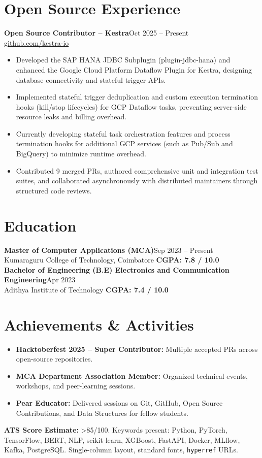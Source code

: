\documentclass[10pt]{article}
\begin{document}
\section{Open Source Experience}
\textbf{Open Source Contributor -- Kestra}\hfill Oct 2025 -- Present\\
\href{https://github.com/kestra-io}{github.com/kestra-io}
\begin{itemize}
  \item Developed the SAP HANA JDBC Subplugin (plugin-jdbc-hana) and enhanced the Google Cloud Platform Dataflow Plugin for Kestra, designing database connectivity and stateful trigger APIs.
  \item Implemented stateful trigger deduplication and custom execution termination hooks (kill/stop lifecycles) for GCP Dataflow tasks, preventing server-side resource leaks and billing overhead.
  \item Currently developing stateful task orchestration features and process termination hooks for additional GCP services (such as Pub/Sub and BigQuery) to minimize runtime overhead.
  \item Contributed 9 merged PRs, authored comprehensive unit and integration test suites, and collaborated asynchronously with distributed maintainers through structured code reviews.
\end{itemize}

\section{Education}
\textbf{Master of Computer Applications (MCA)}\hfill Sep 2023 -- Present\\
Kumaraguru College of Technology, Coimbatore \hfill \textbf{CGPA: 7.8 / 10.0}
\\
\textbf{Bachelor of Engineering (B.E) Electronics and Communication Engineering}\hfill Apr 2023 \\
Adithya Institute of Technology \hfill \textbf{CGPA: 7.4 / 10.0}

\section{Achievements \& Activities}
\begin{itemize}
  \item \textbf{Hacktoberfest 2025 -- Super Contributor:} Multiple accepted PRs across open-source repositories.
  \item \textbf{MCA Department Association Member:} Organized technical events, workshops, and peer-learning sessions.
  \item \textbf{Pear Educator:} Delivered sessions on Git, GitHub, Open Source Contributions, and Data Structures for fellow students.
\end{itemize}

\vfill\noindent\scriptsize
\textbf{ATS Score Estimate:} \textgreater 85/100. Keywords present: Python, PyTorch, TensorFlow, BERT, NLP, scikit-learn, XGBoost, FastAPI, Docker, MLflow, Kafka, PostgreSQL. Single-column layout, standard fonts, \texttt{hyperref} URLs.
\end{document}
